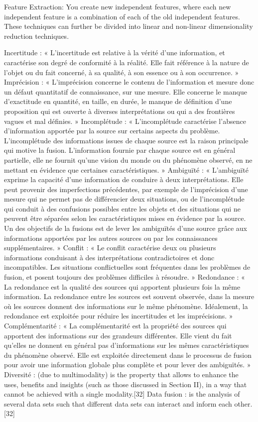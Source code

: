	Feature Extraction: You create new independent features, where each new independent feature is a combination of each of the old independent features. These techniques can further be divided into linear and non-linear dimensionality reduction techniques.

Incertitude :
« L’incertitude est relative à la vérité d’une information, et caractérise son degré de conformité à la réalité. Elle fait référence à la nature de l’objet ou du fait concerné, à sa qualité, à son essence ou à son occurrence. »
Imprécision :
« L’imprécision concerne le contenu de l’information et mesure donc un défaut quantitatif de connaissance, sur une mesure. Elle concerne le manque d’exactitude en quantité, en taille, en durée, le manque de définition d’une proposition qui est ouverte à diverses interprétations ou qui a des frontières vagues et mal définies. »
Incomplétude : 
« L’incomplétude caractérise l’absence d’information apportée par la source sur certains aspects du problème. L’incomplétude des informations issues de chaque source est la raison principale qui motive la fusion. L’information fournie par chaque source est en général partielle, elle ne fournit qu’une vision du monde ou du phénomène observé, en ne mettant en évidence que certaines caractéristiques. »
Ambiguïté :
« L’ambiguïté exprime la capacité d’une information de conduire à deux interprétations. Elle peut provenir des imperfections précédentes, par exemple de l’imprécision d’une mesure qui ne permet pas de différencier deux situations, ou de l’incomplétude qui conduit à des confusions possibles entre les objets et des situations qui ne peuvent être séparées selon les caractéristiques mises en évidence par la source. Un des objectifs de la fusions est de lever les ambiguïtés d’une source grâce aux informations apportées par les autres sources ou par les connaissances supplémentaires. »
Conflit :
« Le conflit caractérise deux ou plusieurs informations conduisant à des interprétations contradictoires et donc incompatibles. Les situations conflictuelles sont fréquentes dans les problèmes de fusion, et posent toujours des problèmes difficiles à résoudre. »
Redondance :
« La redondance est la qualité des sources qui apportent plusieurs fois la même information. La redondance entre les sources est souvent observée, dans la mesure où les sources donnent des informations sur le même phénomène. Idéalement, la redondance est exploitée pour réduire les incertitudes et les imprécisions. »
Complémentarité :
« La complémentarité est la propriété des sources qui apportent des informations sur des grandeurs différentes. Elle vient du fait qu’elles ne donnent en général pas d’informations sur les mêmes caractéristiques du phénomène observé. Elle est exploitée directement dans le processus de fusion pour avoir une information globale plus complète et pour lever des ambiguïtés. »
Diversité : (due to multimodality) is the property that allows to enhance the uses, benefits and insights (such as those discussed in Section II), in a way that cannot be achieved with a single modality.[32]
Data fusion : is the analysis of several data sets such that different data sets can interact and inform each other.[32]

